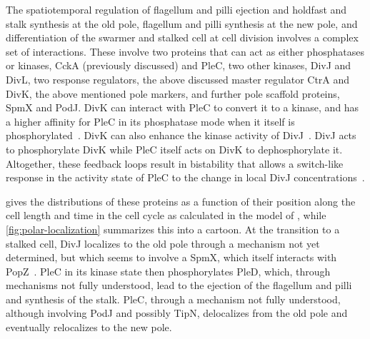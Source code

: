 The spatiotemporal regulation of flagellum and pilli ejection and holdfast and stalk synthesis at the old pole, flagellum and pilli synthesis at the new pole, and differentiation of the swarmer and stalked cell at cell division involves a complex set of interactions.
These involve two proteins that can act as either phosphatases or kinases, CckA (previously discussed) and PleC, two other kinases, DivJ and DivL, two response regulators, the above discussed master regulator CtrA and DivK, the above mentioned pole markers, and further pole scaffold proteins, SpmX and PodJ.
DivK can interact with PleC to convert it to a kinase, and has a higher affinity for PleC in its phosphatase mode when it itself is phosphorylated~\cite{subramanian2017}.
DivK can also enhance the kinase activity of DivJ~\cite{kirkpatrick2012}.
DivJ acts to phosphorylate DivK while PleC itself acts on DivK to dephosphorylate it.
Altogether, these feedback loops result in bistability that allows a switch-like response in the activity state of PleC to the change in local DivJ concentrations~\cite{subramanian2017}.

 gives the distributions of these proteins as a function of their position along the cell length and time in the cell cycle as calculated in the model of \textcite{subramanian2015}, while \cref{fig:polar-localization} summarizes this into a cartoon.
At the transition to a stalked cell, DivJ localizes to the old pole through a mechanism not yet determined, but which seems to involve a SpmX, which itself interacts with PopZ~\cite{kirkpatrick2012}.
PleC in its kinase state then phosphorylates PleD, which, through mechanisms not fully understood, lead to the ejection of the flagellum and pilli and synthesis of the stalk.
PleC, through a mechanism not fully understood, although involving PodJ and possibly TipN, delocalizes from the old pole and eventually relocalizes to the new pole.

